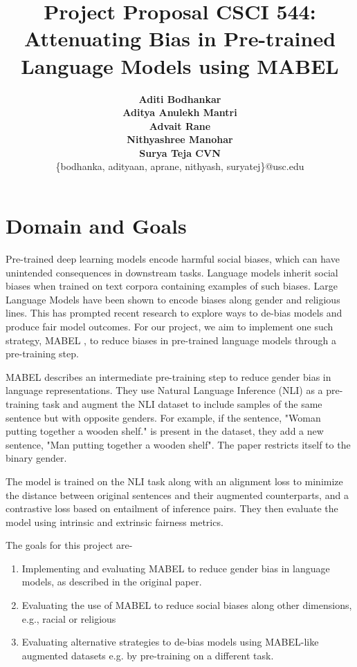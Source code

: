 \documentclass[11pt]{article}
\title{Project Proposal CSCI 544: Attenuating Bias in Pre-trained Language Models using MABEL}
\author{{\bf Aditi Bodhankar} \\ {\bf Aditya Anulekh Mantri} \\ {\bf Advait Rane} \\ {\bf Nithyashree Manohar} \\ {\bf Surya Teja CVN} \\ \{bodhanka, adityaan, aprane, nithyash, suryatej\}@usc.edu}
\begin{document}
\maketitle

\section{Domain and Goals}
Pre-trained deep learning models encode harmful social biases, which can have unintended consequences in downstream tasks. Language models
inherit social biases when trained on text
corpora containing examples of such biases. Large Language Models have been shown to encode biases along gender and religious lines. This has prompted recent research to explore ways to de-bias models and produce fair model outcomes. For our project, we aim to implement one such strategy, MABEL \cite{he2022mabel}, to reduce biases in pre-trained language models through a pre-training step.

MABEL describes an intermediate pre-training step to reduce gender bias in language representations. They use Natural Language Inference (NLI) as a pre-training task and augment the NLI dataset to include samples of the same sentence but with opposite genders. For example, if the sentence, "Woman putting together a wooden shelf." is present in the dataset, they add a new sentence, "Man putting together a wooden shelf". The paper restricts itself to the binary gender. 

The model is trained on the NLI task along with an alignment loss to minimize the distance between original sentences and their augmented counterparts, and a contrastive loss based on entailment of inference pairs. They then evaluate the model using intrinsic and extrinsic fairness metrics. 

The goals for this project are-
\begin{enumerate}
    \item Implementing and evaluating MABEL to reduce gender bias in language models, as described in the original paper.
    \item Evaluating the use of MABEL to reduce social biases along other dimensions, e.g., racial or religious
    \item Evaluating alternative strategies to de-bias models using MABEL-like augmented datasets e.g. by pre-training on a different task.
\end{enumerate}
\end{document}
